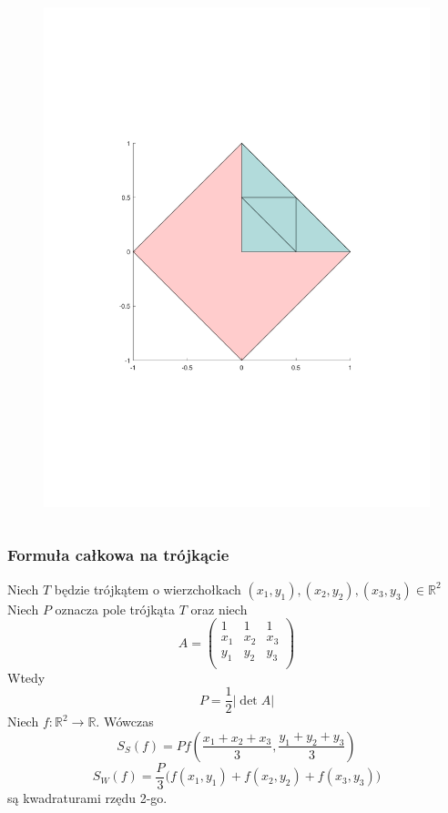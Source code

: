 \documentclass[9pt]{beamer}
\begin{document}
\begin{frame}
\begin{columns}[T, onlytextwidth]
		\begin{column}{0.5\textwidth} %
			\begin{figure}
				\centering
				\includegraphics[width=\linewidth]{part4.pdf}
			\end{figure}
		\end{column}
	\end{columns}
\end{frame}


\begin{frame}
    \frametitle{Formuła całkowa na trójkącie}
    Niech $T$ będzie trójkątem o wierzchołkach $(x_1,y_1), (x_2,y_2), (x_3,y_3) \in \mathbb{R}^2$
    Niech $P$ oznacza pole trójkąta $T$ oraz niech 
    $$ A = \begin{pmatrix}
    	1 & 1 & 1 \\
    	x_1 & x_2 & x_3 \\
    	y_1 & y_2 & y_3 \\
    \end{pmatrix} $$
    Wtedy $$P = \frac{1}{2}|\det{A}|$$
    Niech $f : \mathbb{R}^2 \to \mathbb{R}$. Wówczas 
    $$S_S(f) = P f \left(\frac{x_1+x_2+x_3}{3},\frac{y_1+y_2+y_3}{3} \right) $$
    $$S_W(f) = \frac{P}{3} \Big( f(x_1,y_1) + f(x_2,y_2) + f(x_3,y_3) \Big)$$
    są kwadraturami rzędu 2-go.
    
\end{frame}
\end{document}
